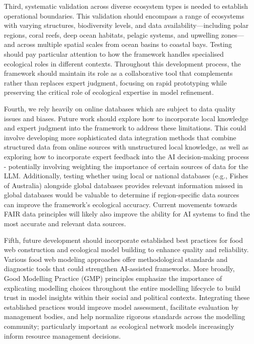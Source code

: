 Third, systematic validation across diverse ecosystem types is needed to establish operational boundaries. This validation should encompass a range of ecosystems with varying structures, biodiversity levels, and data availability—including polar regions, coral reefs, deep ocean habitats, pelagic systems, and upwelling zones—and across multiple spatial scales from ocean basins to coastal bays. Testing should pay particular attention to how the framework handles specialised ecological roles in different contexts. Throughout this development process, the framework should maintain its role as a collaborative tool that complements rather than replaces expert judgment, focusing on rapid prototyping while preserving the critical role of ecological expertise in model refinement.

Fourth, we rely heavily on online databases which are subject to data quality issues and biases. Future work should explore how to incorporate local knowledge and expert judgment into the framework to address these limitations. This could involve developing more sophisticated data integration methods that combine structured data from online sources with unstructured local knowledge, as well as exploring how to incorporate expert feedback into the AI decision-making process - potentially involving weighting the importance of certain sources of data for the LLM. Additionally, testing whether using local or national databases (e.g., Fishes of Australia) alongside global databases provides relevant information missed in global databases would be valuable to determine if region-specific data sources can improve the framework's ecological accuracy. Current movements towards FAIR data principles \citep{tanhua2019ocean} will likely also improve the ability for AI systems to find the most accurate and relevant data sources.

Fifth, future development should incorporate established best practices for food web construction and ecological model building to enhance quality and reliability. Various food web modeling approaches offer methodological standards \citep{Christensen2004, heymans2016best} and diagnostic tools \citep{link2010adding} that could strengthen AI-assisted frameworks. More broadly, Good Modelling Practice (GMP) principles \citep{jakeman2024towards} emphasize the importance of explicating modelling choices throughout the entire modelling lifecycle to build trust in model insights within their social and political contexts. Integrating these established practices would improve model assessment, facilitate evaluation by management bodies, and help normalize rigorous standards across the modelling community; particularly important as ecological network models increasingly inform resource management decisions.

